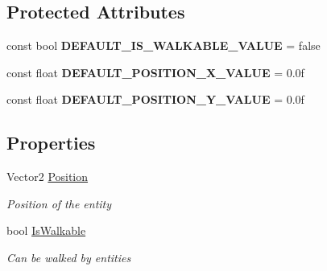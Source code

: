 \subsection*{Protected Attributes}
\begin{DoxyCompactItemize}
\item 
\hypertarget{class_hel_project_1_1_game_world_1_1_h_object_aa48be7d1041c9417c831a904bd52377f}{}const bool {\bfseries D\+E\+F\+A\+U\+L\+T\+\_\+\+I\+S\+\_\+\+W\+A\+L\+K\+A\+B\+L\+E\+\_\+\+V\+A\+L\+U\+E} = false\label{class_hel_project_1_1_game_world_1_1_h_object_aa48be7d1041c9417c831a904bd52377f}

\item 
\hypertarget{class_hel_project_1_1_game_world_1_1_h_object_a32e043831c6f30e1a73ee033f9d00483}{}const float {\bfseries D\+E\+F\+A\+U\+L\+T\+\_\+\+P\+O\+S\+I\+T\+I\+O\+N\+\_\+\+X\+\_\+\+V\+A\+L\+U\+E} = 0.\+0f\label{class_hel_project_1_1_game_world_1_1_h_object_a32e043831c6f30e1a73ee033f9d00483}

\item 
\hypertarget{class_hel_project_1_1_game_world_1_1_h_object_a5b601f5ab506ca13d2f27ec8d0bd0540}{}const float {\bfseries D\+E\+F\+A\+U\+L\+T\+\_\+\+P\+O\+S\+I\+T\+I\+O\+N\+\_\+\+Y\+\_\+\+V\+A\+L\+U\+E} = 0.\+0f\label{class_hel_project_1_1_game_world_1_1_h_object_a5b601f5ab506ca13d2f27ec8d0bd0540}

\end{DoxyCompactItemize}
\subsection*{Properties}
\begin{DoxyCompactItemize}
\item 
Vector2 \hyperlink{class_hel_project_1_1_game_world_1_1_h_object_af5297b9bdeac2d179b0bee66ff111f94}{Position}
\begin{DoxyCompactList}\small\item\em Position of the entity \end{DoxyCompactList}\item 
bool \hyperlink{class_hel_project_1_1_game_world_1_1_h_object_a97444e657db0148fb442570fbd7fe98f}{Is\+Walkable}
\begin{DoxyCompactList}\small\item\em Can be walked by entities \end{DoxyCompactList}\end{DoxyCompactItemize}


